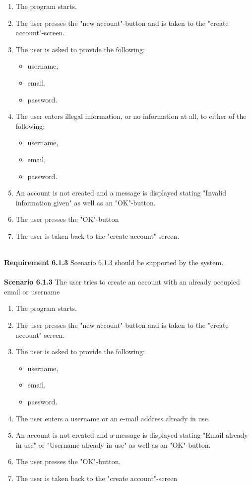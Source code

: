 \documentclass{article}
\begin{document}
\begin{enumerate}
    \item The program starts.
    \item The user presses the "new account"-button and is taken to the "create account"-screen.
   \item The user is asked to provide the following:
        \begin{itemize}
            \item username,
            \item email,
            \item password.
        \end{itemize}
    \item The user enters illegal information, or no information at all, to either of the following: 
        \begin{itemize}
            \item username,
            \item email,
            \item password.
        \end{itemize}
    \item An account is not created and a message is displayed stating "Invalid information given" as well as an "OK"-button. 
    \item The user presses the "OK"-button 
    \item The user is taken back to the "create account"-screen.
\end{enumerate}
\mbox{}\\
\textbf{Requirement 6.1.3} Scenario 6.1.3 should be supported by the system.
\\ \\
\textbf{Scenario 6.1.3} The user tries to create an account with an already occupied email or username
\\
\begin{enumerate}
    \item The program starts.
    \item The user presses the "new account"-button and is taken to the "create account"-screen.
    \item The user is asked to provide the following: 
        \begin{itemize}
            \item username,
            \item email,
            \item password.
        \end{itemize}
    \item The user enters a username or an e-mail address already in use.
    \item An account is not created and a message is displayed stating "Email already in use" or "Username already in use" as well as an "OK"-button. 
    \item The user presses the "OK"-button.
    \item The user is taken back to the "create account"-screen
\end{enumerate}
\end{document}
